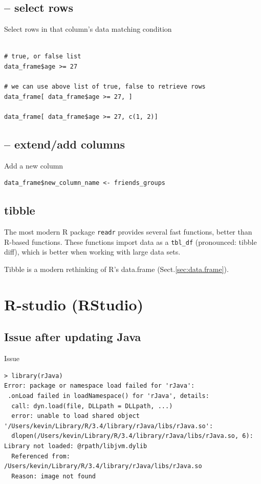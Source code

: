 \subsection{-- select rows}

Select rows in that column's data matching condition
\begin{verbatim}

# true, or false list
data_frame$age >= 27

# we can use above list of true, false to retrieve rows
data_frame[ data_frame$age >= 27, ]

data_frame[ data_frame$age >= 27, c(1, 2)]

\end{verbatim}

\subsection{-- extend/add columns}

Add a new column 
\begin{verbatim}
data_frame$new_column_name <- friends_groups
\end{verbatim}

\subsection{tibble}
\label{sec:tibble-intro}

The most modern R package \verb!readr! provides several fast functions, better
than R-based functions.
These functions import data as a \verb!tbl_df! (pronounced: tibble diff), which
is better when working with large data sets.

Tibble is a modern rethinking of R's data.frame (Sect.\ref{sec:data.frame}).

\section{R-studio (RStudio)}


\subsection{Issue after updating Java}

Issue
\begin{verbatim}
> library(rJava)
Error: package or namespace load failed for 'rJava':
 .onLoad failed in loadNamespace() for 'rJava', details:
  call: dyn.load(file, DLLpath = DLLpath, ...)
  error: unable to load shared object '/Users/kevin/Library/R/3.4/library/rJava/libs/rJava.so':
  dlopen(/Users/kevin/Library/R/3.4/library/rJava/libs/rJava.so, 6): Library not loaded: @rpath/libjvm.dylib
  Referenced from: /Users/kevin/Library/R/3.4/library/rJava/libs/rJava.so
  Reason: image not found
\end{verbatim}


